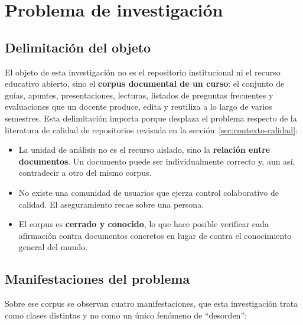 \section{Problema de investigación}
\label{sec:problema}

\subsection{Delimitación del objeto}
\label{sec:problema-objeto}

El objeto de esta investigación no es el repositorio institucional ni el recurso
educativo abierto, sino el \textbf{corpus documental de un curso}: el conjunto de
guías, apuntes, presentaciones, lecturas, listados de preguntas frecuentes y
evaluaciones que un docente produce, edita y reutiliza a lo largo de varios
semestres. Esta delimitación importa porque desplaza el problema respecto de la
literatura de calidad de repositorios revisada en la
sección~\ref{sec:contexto-calidad}:

\begin{itemize}
  \item La unidad de análisis no es el recurso aislado, sino la
        \textbf{relación entre documentos}. Un documento puede ser individualmente
        correcto y, aun así, contradecir a otro del mismo corpus.
  \item No existe una comunidad de usuarios que ejerza control colaborativo de
        calidad. El aseguramiento recae sobre una persona.
  \item El corpus es \textbf{cerrado y conocido}, lo que hace posible verificar cada
        afirmación contra documentos concretos en lugar de contra el conocimiento
        general del mundo.
\end{itemize}

\subsection{Manifestaciones del problema}
\label{sec:problema-manifestaciones}

Sobre ese corpus se observan cuatro manifestaciones, que esta investigación trata
como clases distintas y no como un único fenómeno de \enquote{desorden}:

